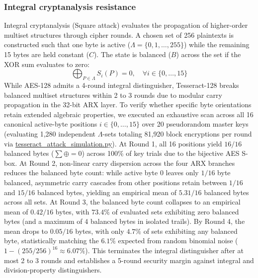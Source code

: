\documentclass[10pt,twocolumn]{article}
\begin{document}
\subsubsection{Integral cryptanalysis resistance}
Integral cryptanalysis (Square attack) evaluates the propagation of higher-order multiset structures through cipher rounds. A chosen set of 256 plaintexts is constructed such that one byte is active ($\Lambda = \{0, 1, \dots, 255\}$) while the remaining 15 bytes are held constant ($C$). The state is balanced ($B$) across the set if the XOR sum evaluates to zero:
\begin{equation}
    \bigoplus_{P \in \Lambda} S_i(P) = 0, \quad \forall i \in \{0, \dots, 15\}
\end{equation}
While AES-128 admits a 4-round integral distinguisher, Tesseract-128 breaks balanced multiset structures within 2 to 3 rounds due to modular carry propagation in the 32-bit ARX layer. To verify whether specific byte orientations retain extended algebraic properties, we executed an exhaustive scan across all 16 canonical active-byte positions $i \in \{0, \dots, 15\}$ over 20 pseudorandom master keys (evaluating 1,280 independent $\Lambda$-sets totaling 81,920 block encryptions per round via \url{tesseract_attack_simulation.py}). At Round 1, all 16 positions yield $16/16$ balanced bytes ($\sum \oplus = 0$) across 100\% of key trials due to the bijective AES S-box. At Round 2, non-linear carry dispersion across the four ARX branches reduces the balanced byte count: while active byte 0 leaves only $1/16$ byte balanced, asymmetric carry cascades from other positions retain between $1/16$ and $15/16$ balanced bytes, yielding an empirical mean of $5.31/16$ balanced bytes across all sets. At Round 3, the balanced byte count collapses to an empirical mean of $0.42/16$ bytes, with $73.4\%$ of evaluated sets exhibiting zero balanced bytes (and a maximum of 4 balanced bytes in isolated trails). By Round 4, the mean drops to $0.05/16$ bytes, with only $4.7\%$ of sets exhibiting any balanced byte, statistically matching the $6.1\%$ expected from random binomial noise ($1 - (255/256)^{16} \approx 6.07\%$). This terminates the integral distinguisher after at most 2 to 3 rounds and establishes a 5-round security margin against integral and division-property distinguishers.
\end{document}
